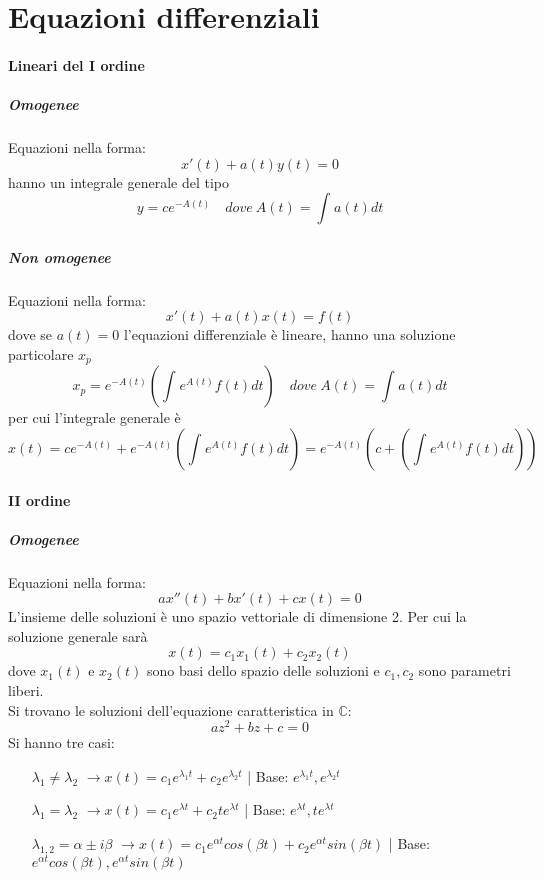 \documentclass[a4paper, titlepage]{report}%
\theoremstyle{definition} %
\theoremstyle{plain}
\theoremstyle{plain}
\theoremstyle{remark}
\theoremstyle{remark}
\theoremstyle{plain}
\theoremstyle{plain}
\theoremstyle{plain}
\theoremstyle{plain}
\theoremstyle{plain}
\begin{document}
\section*{Equazioni differenziali}

\paragraph*{Lineari del I ordine}
     \subparagraph*{Omogenee}
Equazioni nella forma:
     \[
          x'(t) + a(t)y(t) = 0  
     \]
hanno un integrale generale del tipo 
\[
      y = ce^{-A(t)}   \quad dove \ A(t) = \int_{}^{}a(t)dt    
\]

    
     \subparagraph*{Non omogenee}
Equazioni nella forma:
\[
     x'(t) + a(t)x(t) =  f(t) 
\]
dove se $a(t) = 0$ l'equazioni differenziale è lineare, hanno una
soluzione particolare $x_p$
\[
       x_p = e^{-A(t)}(\int_{}^{}e^{A(t)}f(t)dt)
       \quad dove \ A(t) = \int_{}^{}a(t)dt
\]
per cui l'integrale generale è
\[
    x(t)= ce^{-A(t)} + e^{-A(t)}(\int_{}^{}e^{A(t)}f(t)dt) =
    e^{-A(t)}(c + (\int_{}^{}e^{A(t)}f(t)dt))
\]










\paragraph*{II ordine}
\subparagraph*{Omogenee}
Equazioni nella forma:
\[
     ax''(t) + bx'(t) + cx(t)= 0
\]
L'insieme delle soluzioni è uno spazio vettoriale di dimensione
2. Per cui la soluzione generale sarà
\[
     x(t)= c_1 x_1(t) + c_2x_2(t)    
\]
dove $x_1(t)$ e $x_2(t)$ sono basi dello spazio delle soluzioni e 
$c_1,c_2$ sono parametri liberi. \\
Si trovano le soluzioni dell'equazione caratteristica in $\mathbb{C}$:
\[
     az^2 + bz +c = 0    
\]
Si hanno tre casi:
\begin{enumerate}
    \item[$\lambda_1 \neq \lambda_2$] 
    $\rightarrow x(t)= c_1e^{\lambda_1 t}+ c_2e^{\lambda_2 t}$ |
    Base: $e^{\lambda_1 t},e^{\lambda_2 t}$
    \item[$\lambda_1 = \lambda_2$] 
    $\rightarrow x(t)= c_1e^{\lambda t}+ c_2te^{\lambda t}$ |
    Base: $e^{\lambda t}, te^{\lambda t}$
    \item[$\lambda_{1,2} = \alpha \pm i\beta$] 
    $\rightarrow x(t)= c_1e^{\alpha t}cos(\beta t)+ c_2
    e^{\alpha t}sin(\beta t)$ |
    Base: $e^{\alpha t}cos(\beta t),e^{\alpha t}sin(\beta t)$ 
\end{enumerate}
\end{document}
